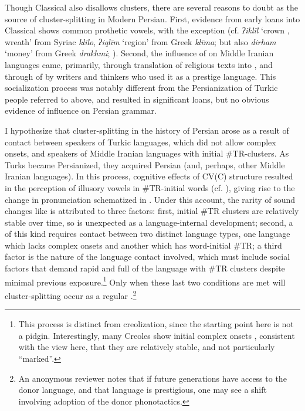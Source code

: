 \documentclass[output=paper,
modfonts
]{LSP/langsci}
\begin{document}
Though Classical  also disallows  clusters, there are several
reasons to doubt  as the source of cluster-splitting  in
Modern Persian. First, evidence from early loans into Classical 
shows common prothetic vowels, with  the exception (cf. 
\emph{ʔiklīl} `crown , wreath' from Syriac \emph{klīlo}, 
\emph{ʔiqlīm} `region' from Greek \emph{klīma}; but also 
\emph{dirham} `money' from Greek \emph{drakhmi}; \citealt{bueasa2015a}). Second,
the influence of  on Middle Iranian languages came, primarily,
through translation of religious texts into , and through
 of  by writers and thinkers who used it as a prestige
language. This socialization process was notably different from the
Persianization of Turkic people referred to above, and resulted in
significant loans, but no obvious evidence of  influence on
Persian grammar.

I hypothesize that cluster-splitting  in the history of
Persian arose as a result of contact between speakers of Turkic
languages, which did not allow complex onsets, and speakers of Middle
Iranian languages with initial \#TR-clusters. As Turks became
Persianized, they acquired Persian (and, perhaps, other Middle Iranian
languages). In this process, cognitive effects of CV(C) 
structure resulted in the perception of illusory vowels in \#TR-initial
words (cf. \citealt{dupoux1999a}), giving rise to the change in
pronunciation schematized in . Under this account, the rarity of
sound changes like  is attributed to three factors: first, initial
\#TR clusters are relatively stable over time, so  is unexpected as a
language-internal development; second, a  of this kind
requires contact between two distinct language types, one language which
lacks complex onsets and another which has word-initial \#TR; a third
factor is the nature of the language contact involved, which must
include social factors that demand rapid and full  of the
language with \#TR clusters despite minimal previous exposure.\footnote{This
  process is distinct from creolization, since the starting point here
  is not a pidgin. Interestingly, many Creoles show initial complex
  onsets \citep{klein2013a}, consistent with the view here, that they are
  relatively stable, and not particularly ``marked''.} Only when these
last two conditions are met will cluster-splitting  occur as a
regular .\footnote{An anonymous reviewer notes that if
  future generations have access to the donor language, and that
  language is prestigious, one may see a shift involving adoption of the
  donor phonotactics.}
\end{document}
